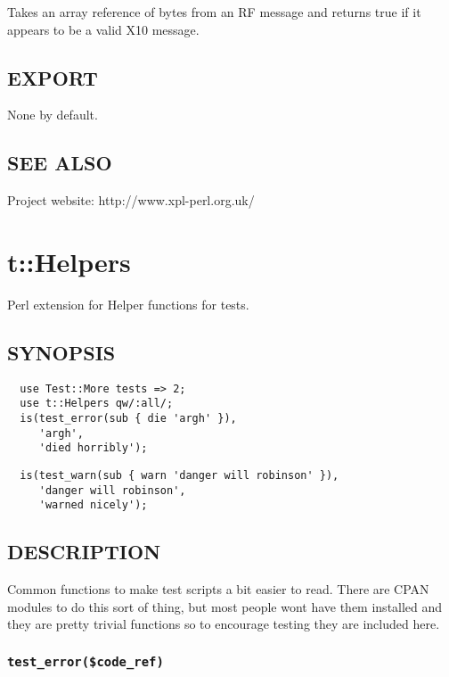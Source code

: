 Takes an array reference of bytes from an RF message and returns true
if it appears to be a valid X10 message.

\subsection*{EXPORT\label{xPL::X10_EXPORT}}


None by default.

\subsection*{SEE ALSO\label{xPL::X10_SEE_ALSO}}


Project website: http://www.xpl-perl.org.uk/

\section{t::Helpers\label{t::Helpers}}


Perl extension for Helper functions for tests.

\subsection*{SYNOPSIS\label{t::Helpers_SYNOPSIS}}
\begin{verbatim}
  use Test::More tests => 2;
  use t::Helpers qw/:all/;
  is(test_error(sub { die 'argh' }),
     'argh',
     'died horribly');
\end{verbatim}
\begin{verbatim}
  is(test_warn(sub { warn 'danger will robinson' }),
     'danger will robinson',
     'warned nicely');
\end{verbatim}
\subsection*{DESCRIPTION\label{t::Helpers_DESCRIPTION}}


Common functions to make test scripts a bit easier to read.  There are
CPAN modules to do this sort of thing, but most people wont have them
installed and they are pretty trivial functions so to encourage
testing they are included here.

\subsubsection*{\texttt{test\_error(\$code\_ref)}\label{t::Helpers_test_error_code_ref_}}


